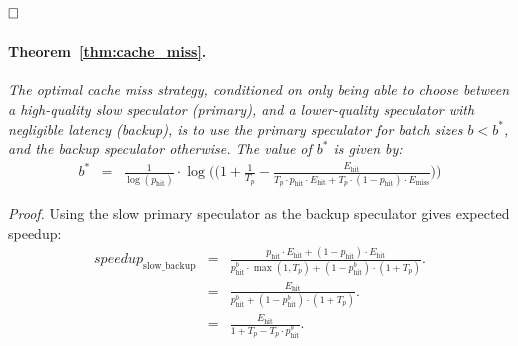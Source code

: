 $\hfill\square$



\paragraph{Theorem~\ref{thm:cache_miss}.}
\label{thm:cache_miss_app}
\textit{The optimal cache miss strategy, conditioned on only being able to choose between a high-quality slow speculator (primary), and a lower-quality speculator with negligible latency (backup), is to use the primary speculator for batch sizes $b < b^*$, and the backup speculator otherwise.
The value of $b^*$ is given by:}
\begin{eqnarray*}
    b^* &=& \frac{1}{\log(p_{\mathrm{hit}})} \cdot \log\Bigg( \bigg(1 + \frac{1}{T_p} - \frac{E_{\mathrm{hit}}}{T_p\cdot p_{\mathrm{hit}} \cdot E_{\mathrm{hit}} + T_p\cdot (1-p_{\mathrm{hit}})\cdot E_{\mathrm{miss}}} \bigg)\Bigg)
\end{eqnarray*}

\textit{Proof.} Using the slow primary speculator as the backup speculator gives expected speedup:
\begin{eqnarray*}
speedup_{\mathrm{slow\_backup}} &=& \frac{p_{\mathrm{hit}} \cdot E_{\mathrm{hit}} + (1-p_{\mathrm{hit}}) \cdot E_{\mathrm{hit}}}{p_{\mathrm{hit}}^b \cdot \max(1, T_p) + (1-p_{\mathrm{hit}}^b) \cdot (1 + T_p)}. \\
&=& \frac{E_{\mathrm{hit}}}{p_{\mathrm{hit}}^b  + (1-p_{\mathrm{hit}}^b) \cdot (1 + T_p)}. \\
&=& \frac{E_{\mathrm{hit}}}{1 + T_p - T_p \cdot p_{\mathrm{hit}}^b}. \\
\end{eqnarray*}

